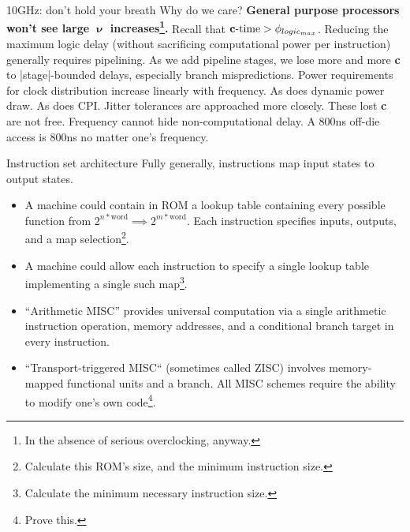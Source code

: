 \documentclass[mathserif,xcolor={dvipsnames,table}]{beamer}
\begin{document}
\begin{frame}{10GHz: don't hold your breath}
Why do we care?
\vfill
\textbf{General purpose processors won't see large $\boldsymbol \upnu$ increases\footnote{In the absence of serious overclocking, anyway.}.}
\vfill
Recall that $\text{\textbf{c}-time} > \phi_{logic_{max}}$. Reducing the maximum logic
delay (without sacrificing computational power per instruction) generally
requires pipelining. As we add pipeline stages, we lose more and more
\textbf{c} to |stage|-bounded delays, especially branch mispredictions.
\vfill
Power requirements for clock distribution increase linearly with frequency.
As does dynamic power draw. As does CPI. Jitter tolerances are approached
more closely. These lost \textbf{c} are not free.
\vfill
Frequency cannot hide non-computational delay. A 800ns off-die access is 800ns
no matter one's frequency.
\end{frame}

\begin{frame}{Instruction set architecture}
Fully generally, instructions map input states to output states.
\small{
\begin{itemize}
\item A machine could contain in ROM a lookup table containing every possible
function from $2^{n*\text{word}}\implies 2^{m*\text{word}}$. Each instruction
specifies inputs, outputs, and a map selection\footnote{Calculate this ROM's size, and the minimum instruction size.}.
\item A machine could allow each instruction to specify a single lookup table implementing
a single such map\footnote{Calculate the minimum necessary instruction size.}.
\item ``Arithmetic MISC'' provides universal computation via a single arithmetic instruction
operation, memory addresses, and a conditional branch target in every instruction.
\item``Transport-triggered MISC`` (sometimes called ZISC) involves memory-mapped
functional units and a branch. All MISC schemes require the ability to modify one's
own code\footnote{Prove this.}.
\end{itemize}
}
\end{frame}
\end{document}
